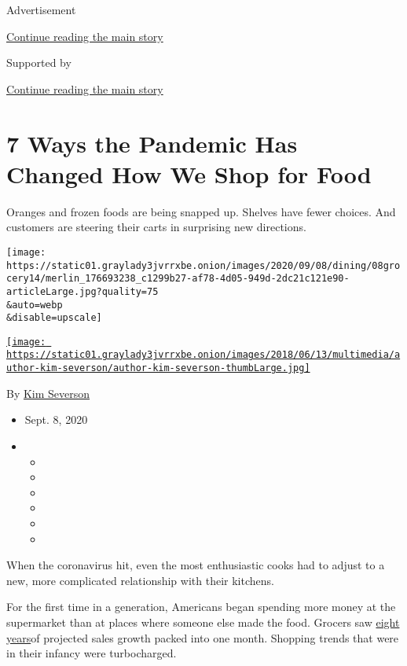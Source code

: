 Advertisement

\protect\hyperlink{after-top}{Continue reading the main story}

Supported by

\protect\hyperlink{after-sponsor}{Continue reading the main story}

\hypertarget{7-ways-the-pandemic-has-changed-how-we-shop-for-food}{%
\section{7 Ways the Pandemic Has Changed How We Shop for
Food}\label{7-ways-the-pandemic-has-changed-how-we-shop-for-food}}

Oranges and frozen foods are being snapped up. Shelves have fewer
choices. And customers are steering their carts in surprising new
directions.

\texttt{[image: https://static01.graylady3jvrrxbe.onion/images/2020/09/08/dining/08grocery14/merlin\_176693238\_c1299b27-af78-4d05-949d-2dc21c121e90-articleLarge.jpg?quality=75\\\&auto=webp\\\&disable=upscale]}

\href{https://www.nytimes3xbfgragh.onion/by/kim-severson}{\texttt{[image: https://static01.graylady3jvrrxbe.onion/images/2018/06/13/multimedia/author-kim-severson/author-kim-severson-thumbLarge.jpg]}}

By \href{https://www.nytimes3xbfgragh.onion/by/kim-severson}{Kim
Severson}

\begin{itemize}
\item
  Sept. 8, 2020
\item
  \begin{itemize}
  \item
  \item
  \item
  \item
  \item
  \item
  \end{itemize}
\end{itemize}

When the coronavirus hit, even the most enthusiastic cooks had to adjust
to a new, more complicated relationship with their kitchens.

For the first time in a generation, Americans began spending more money
at the supermarket than at places where someone else made the food.
Grocers saw
\href{https://www.theshelbyreport.com/2020/06/12/fmi-report-american-shoppers-adjust/}{eight
years}of projected sales growth packed into one month. Shopping trends
that were in their infancy were turbocharged.

